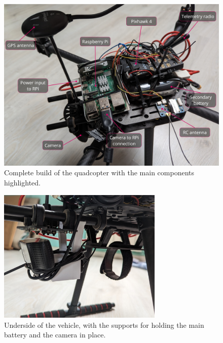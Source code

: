 \begin{figure}
  \centering
  \includegraphics[width=1\textwidth, keepaspectratio]{img/full-build.jpg}
  \caption{Complete build of the quadcopter with the main components highlighted.}\label{fig:full-build}
\end{figure}

\begin{figure}
  \centering
  \includegraphics[width=0.7\textwidth, keepaspectratio]{img/underside-2.jpg}
  \caption{Underside of the vehicle, with the supports for holding the main battery and the camera in place.}
  \label{fig:camera-holder-closeup}
\end{figure}



